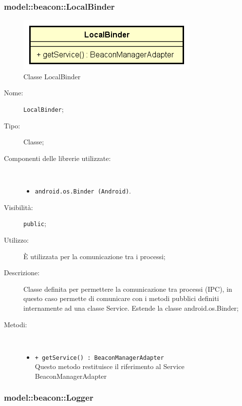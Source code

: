 \documentclass[../DefinizioneDiProdotto.tex]{subfiles}
\begin{document}
\subsubsection{model::beacon::LocalBinder}

    \begin{figure}[H]
        \centering
        \includegraphics{img/LocalBinder.png}
        \caption{Classe LocalBinder}\label{fig:model::beacon::LocalBinder} 
    \end{figure}
    \begin{description}
\item[Nome:] \texttt{LocalBinder};
\item[Tipo:] Classe;
\item[Componenti delle librerie utilizzate:] \
\begin{itemize}
\item \texttt{android.os.Binder (Android)}.

\end{itemize}
\item[Visibilità:] \texttt{public};
\item[Utilizzo:] È utilizzata per la comunicazione tra i processi;
\item[Descrizione:] Classe definita per permettere la comunicazione tra processi (IPC), in questo caso permette di comunicare con i metodi pubblici definiti internamente ad una classe Service. Estende la classe android.os.Binder;
\item[Metodi:] \
\begin{itemize}
\item \texttt{+ getService() : BeaconManagerAdapter}\\
Questo metodo restituisce il riferimento al Service BeaconManagerAdapter
 \end{itemize}
\end{description}

\subsubsection{model::beacon::Logger}
\end{document}
